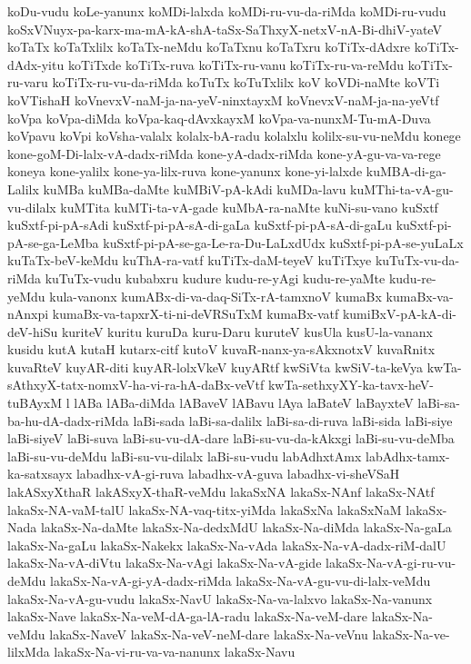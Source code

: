 {koDu-vudu
koLe-yanunx
koMDi-lalxda
koMDi-ru-vu-da-riMda
koMDi-ru-vudu
koSxVNuyx-pa-karx-ma-mA-kA-shA-taSx-SaThxyX-netxV-nA-Bi-dhiV-yateV
koTaTx
koTaTxlilx
koTaTx-neMdu
koTaTxnu
koTaTxru
koTiTx-dAdxre
koTiTx-dAdx-yitu
koTiTxde
koTiTx-ruva
koTiTx-ru-vanu
koTiTx-ru-va-reMdu
koTiTx-ru-varu
koTiTx-ru-vu-da-riMda
koTuTx
koTuTxlilx
koV
koVDi-naMte
koVTi
koVTishaH
koVnevxV-naM-ja-na-yeV-ninxtayxM
koVnevxV-naM-ja-na-yeVtf
koVpa
koVpa-diMda
koVpa-kaq-dAvxkayxM
koVpa-va-nunxM-Tu-mA-Duva
koVpavu
koVpi
koVsha-valalx
kolalx-bA-radu
kolalxlu
kolilx-su-vu-neMdu
konege
kone-goM-Di-lalx-vA-dadx-riMda
kone-yA-dadx-riMda
kone-yA-gu-va-va-rege
koneya
kone-yalilx
kone-ya-lilx-ruva
kone-yanunx
kone-yi-lalxde
kuMBA-di-ga-Lalilx
kuMBa
kuMBa-daMte
kuMBiV-pA-kAdi
kuMDa-lavu
kuMThi-ta-vA-gu-vu-dilalx
kuMTita
kuMTi-ta-vA-gade
kuMbA-ra-naMte
kuNi-su-vano
kuSxtf
kuSxtf-pi-pA-sAdi
kuSxtf-pi-pA-sA-di-gaLa
kuSxtf-pi-pA-sA-di-gaLu
kuSxtf-pi-pA-se-ga-LeMba
kuSxtf-pi-pA-se-ga-Le-ra-Du-LaLxdUdx
kuSxtf-pi-pA-se-yuLaLx
kuTaTx-beV-keMdu
kuThA-ra-vatf
kuTiTx-daM-teyeV
kuTiTxye
kuTuTx-vu-da-riMda
kuTuTx-vudu
kubabxru
kudure
kudu-re-yAgi
kudu-re-yaMte
kudu-re-yeMdu
kula-vanonx
kumABx-di-va-daq-SiTx-rA-tamxnoV
kumaBx
kumaBx-va-nAnxpi
kumaBx-va-tapxrX-ti-ni-deVRSuTxM
kumaBx-vatf
kumiBxV-pA-kA-di-deV-hiSu
kuriteV
kuritu
kuruDa
kuru-Daru
kuruteV
kusUla
kusU-la-vananx
kusidu
kutA
kutaH
kutarx-citf
kutoV
kuvaR-nanx-ya-sAkxnotxV
kuvaRnitx
kuvaRteV
kuyAR-diti
kuyAR-lolxVkeV
kuyARtf
kwSiVta
kwSiV-ta-keVya
kwTa-sAthxyX-tatx-nomxV-ha-vi-ra-hA-daBx-veVtf
kwTa-sethxyXY-ka-tavx-heV-tuBAyxM
l
lABa
lABa-diMda
lABaveV
lABavu
lAya
laBateV
laBayxteV
laBi-sa-ba-hu-dA-dadx-riMda
laBi-sada
laBi-sa-dalilx
laBi-sa-di-ruva
laBi-sida
laBi-siye
laBi-siyeV
laBi-suva
laBi-su-vu-dA-dare
laBi-su-vu-da-kAkxgi
laBi-su-vu-deMba
laBi-su-vu-deMdu
laBi-su-vu-dilalx
laBi-su-vudu
labAdhxtAmx
labAdhx-tamx-ka-satxsayx
labadhx-vA-gi-ruva
labadhx-vA-guva
labadhx-vi-sheVSaH
lakASxyXthaR
lakASxyX-thaR-veMdu
lakaSxNA
lakaSx-NAnf
lakaSx-NAtf
lakaSx-NA-vaM-talU
lakaSx-NA-vaq-titx-yiMda
lakaSxNa
lakaSxNaM
lakaSx-Nada
lakaSx-Na-daMte
lakaSx-Na-dedxMdU
lakaSx-Na-diMda
lakaSx-Na-gaLa
lakaSx-Na-gaLu
lakaSx-Nakekx
lakaSx-Na-vAda
lakaSx-Na-vA-dadx-riM-dalU
lakaSx-Na-vA-diVtu
lakaSx-Na-vAgi
lakaSx-Na-vA-gide
lakaSx-Na-vA-gi-ru-vu-deMdu
lakaSx-Na-vA-gi-yA-dadx-riMda
lakaSx-Na-vA-gu-vu-di-lalx-veMdu
lakaSx-Na-vA-gu-vudu
lakaSx-NavU
lakaSx-Na-va-lalxvo
lakaSx-Na-vanunx
lakaSx-Nave
lakaSx-Na-veM-dA-ga-lA-radu
lakaSx-Na-veM-dare
lakaSx-Na-veMdu
lakaSx-NaveV
lakaSx-Na-veV-neM-dare
lakaSx-Na-veVnu
lakaSx-Na-ve-lilxMda
lakaSx-Na-vi-ru-va-va-nanunx
lakaSx-Navu
}

